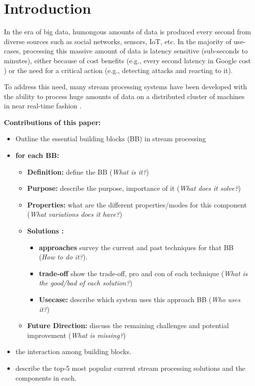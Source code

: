 \section{Introduction}
\label{sec:intro}

In the era of big data, humongous amounts of data is produced every second from diverse sources such as social networks, sensors, IoT, etc. In the majority of use-cases, processing this massive amount of data  is latency sensitive (sub-seconds to minutes), either because of  cost benefits (e.g., every second latency in Google cost ) or the need for a critical action (e.g., detecting attacks and reacting to it).

To address this need, many stream processing systems have been developed with the ability to process huge amounts of data on a distributed cluster of machines in  near real-time fashion .  


\textbf{Contributions of this paper: }

\begin{itemize}
	\item Outline the essential building blocks (BB) in stream processing
	\item \textbf{for each BB: }
	\begin{itemize}
		\item \textbf{Definition: }  define the BB (\textit{What is it?})
		\item \textbf{Purpose: } describe the purpose, importance of it (\textit{What does it solve?})
		\item \textbf{Properties:} what are the different properties/modes for this component (\textit{What variations does it have?})
		\item \textbf{Solutions :}
		\begin{itemize}
		\item \textbf{approaches} survey the current  and past techniques for that BB (\textit{How to do it?}). 
		\item \textbf{trade-off} show the trade-off, pro and con of  each technique (\textit{What is the good/bad of each solution?}) 
		\item \textbf{Usecase: } describe which system uses this approach BB (\textit{Who uses it?})
		\end{itemize}
		\item \textbf{Future Direction:} discuss the remaining challenges and potential improvement (\textit{What is missing?})
	\end{itemize}
	\item the interaction among building blocks.
	\item describe the top-5 most popular current stream processing solutions and the components in each.

\end{itemize}






